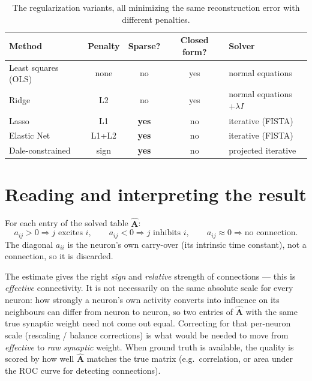 \documentclass[11pt,a4paper]{article}
\newcommand{\Amat}{\mathbf{A}}
\begin{document}
\begin{table}[h]
\centering
\renewcommand{\arraystretch}{1.2}
\begin{tabular}{lcccl}
\toprule
\textbf{Method} & \textbf{Penalty} & \textbf{Sparse?} & \textbf{Closed form?} & \textbf{Solver}\\
\midrule
Least squares (OLS) & none & no & yes & normal equations\\
Ridge & L2 & no & yes & normal equations $+\lambda I$\\
Lasso & L1 & \textbf{yes} & no & iterative (FISTA)\\
Elastic Net & L1+L2 & \textbf{yes} & no & iterative (FISTA)\\
Dale-constrained & sign & \textbf{yes} & no & projected iterative\\
\bottomrule
\end{tabular}
\caption{The regularization variants, all minimizing the same reconstruction
error with different penalties.}
\end{table}

\section{Reading and interpreting the result}

For each entry of the solved table $\widehat{\Amat}$:
\[
a_{ij}>0 \Rightarrow \text{$j$ excites $i$},\qquad
a_{ij}<0 \Rightarrow \text{$j$ inhibits $i$},\qquad
a_{ij}\approx 0 \Rightarrow \text{no connection.}
\]
The diagonal $a_{ii}$ is the neuron's own carry-over (its intrinsic time
constant), not a connection, so it is discarded.

The estimate gives the right \emph{sign} and \emph{relative} strength of
connections --- this is \emph{effective} connectivity. It is not necessarily
on the same absolute scale for every neuron: how strongly a neuron's own
activity converts into influence on its neighbours can differ from neuron to
neuron, so two entries of $\widehat{\Amat}$ with the same true synaptic weight
need not come out equal. Correcting for that per-neuron scale (rescaling /
balance corrections) is what would be needed to move from \emph{effective} to
\emph{raw synaptic} weight. When ground truth is available, the quality is
scored by how well $\widehat{\Amat}$ matches the true matrix (e.g.\
correlation, or area under the ROC curve for detecting connections).

\end{document}
